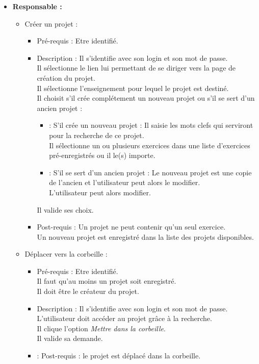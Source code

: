 	\begin{itemize}
	\item {\bf Responsable :}\\
		\begin{itemize}
		\item Cr{\'e}er un projet :
			\begin{itemize}
			\item Pr{\'e}-requis : Etre identifi{\'e}.
			\item Description : Il s'identifie avec son login et son mot de passe.\\
			Il s{\'e}lectionne le lien lui permettant de se diriger vers la page de cr{\'e}ation du projet.\\
			Il s{\'e}lectionne l'enseignement pour lequel le projet est destin{\'e}.\\
			Il choisit s'il cr{\'e}e compl{\'e}tement un nouveau projet ou s'il se sert d'un ancien projet :
			\begin{itemize}
				\item : S'il cr{\'e}e un nouveau projet : Il saisie les mots clefs qui serviront pour la recherche de ce projet.\\
				Il s{\'e}lectionne un ou plusieurs exercices dans une liste d'exercices pr{\'e}-enregistr{\'e}s ou il le(s) importe.
				\item : S'il se sert d'un ancien projet : Le nouveau projet est une copie de l'ancien et l'utilisateur peut alors le modifier.\\
				L'utilisateur peut alors modifier.
			\end{itemize}
			Il valide ses choix.
			\item Post-requis : Un projet ne peut contenir qu'un seul exercice.\\  
			Un nouveau projet est enregistr{\'e} dans la liste des projets disponibles.\\
			\end{itemize}

		\item D{\'e}placer vers la corbeille :
			\begin{itemize}
			\item Pr{\'e}-requis : Etre identifi{\'e}.\\
			Il faut qu'au moins un projet soit enregistr{\'e}.\\
			Il doit {\^e}tre le cr{\'e}ateur du projet.
			\item Description : Il s'identifie avec son login et son mot de passe.\\
			L'utilisateur doit acc{\'e}der au projet gr{\^a}ce {\`a} la recherche.\\
			Il clique l'option {\it Mettre dans la corbeille}.\\
			Il valide sa demande.
			\item : Post-requis : le projet est d{\'e}plac{\'e} dans la corbeille.\\
			\end{itemize}
		\end{itemize}
	\end{itemize}

